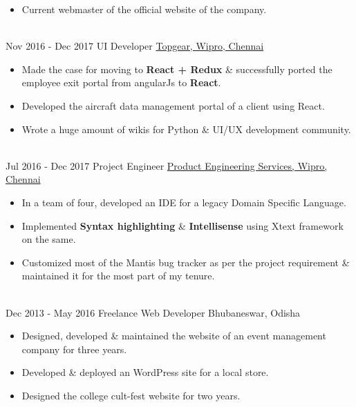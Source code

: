 \documentclass[a4paper]{twentysecondcv} %
\begin{document}
\begin{twenty}
{\begin{itemize}
        \item Current webmaster of the official website of the company.
        \end{itemize}}
        \\
	\twentyitem
    	{Nov 2016 -}
		{Dec 2017}
        {UI Developer}
        {\href{https://www.topcoder.com/}{Topgear, Wipro, Chennai}}
        {}
        {
        {\begin{itemize}
        \item Made the case for moving to \textbf{React + Redux} \& successfully ported the employee exit portal from angularJs to \textbf{React}.
        \item Developed the aircraft data management portal of a client using React.
        \item Wrote a huge amount of wikis for Python \& UI/UX development community.
    \end{itemize}}
        }
     \\
     \twentyitem
    	{Jul 2016 -}
		{Dec 2017}
        {Project Engineer}
        {\href{https://www.wipro.com/en-IN/product-engineering/}{Product Engineering Services, Wipro, Chennai}}
        {}
        {
        \begin{itemize}
        \item In a team of four, developed an IDE for a legacy Domain Specific Language.
        \item Implemented \textbf{Syntax highlighting} \& \textbf{Intellisense} using Xtext framework on the same.
        \item Customized most of the Mantis bug tracker as per the project requirement \& maintained it for the most part of my tenure.
    \end{itemize}
    	}
    	\\
     \twentyitem
   		{Dec 2013 -}
		{May 2016}
        {Freelance Web Developer}
        {Bhubaneswar, Odisha}
        {}
        {
        \begin{itemize}
        \item Designed, developed \& maintained the website of an event management company for three years.
        \item Developed \& deployed an WordPress site for a local store.
        \item Designed the college cult-fest website for two years.

\end{itemize}}
\end{twenty}
\end{document}
